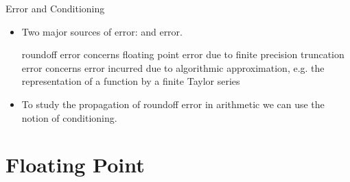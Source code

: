 \begin{frame}{Error and Conditioning}


\begin{itemize}
\item Two major sources of error:  and  error.
\begin{itemize}
\sitem roundoff error concerns floating point error due to finite precision
\sitem truncation error concerns error incurred due to algorithmic approximation, e.g. the representation of a function by a finite Taylor series
\vspace{-.1in}
\end{itemize}
\item To study the propagation of roundoff error in arithmetic we can use the notion of conditioning.
\end{itemize}

\end{frame}

\section{Floating Point}

